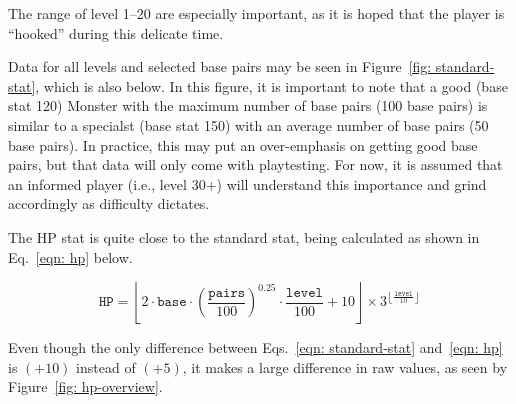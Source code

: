 The range of level 1--20 are especially important, as it is hoped that the player is ``hooked'' during this delicate time.

Data for all levels and selected base pairs may be seen in Figure~\ref{fig: standard-stat}, which is also below. In this figure, it is important to note that a good (base stat 120) Monster with the maximum number of base pairs (100 base pairs) is similar to a specialst (base stat 150) with an average number of base pairs (50 base pairs). In practice, this may put an over-emphasis on getting good base pairs, but that data will only come with playtesting. For now, it is assumed that an informed player (i.e., level 30+) will understand this importance and grind accordingly as difficulty dictates.

			

		




\newpage
{}

The HP stat is quite close to the standard stat, being calculated as shown in Eq.~\eqref{eqn: hp} below.

\begin{equation}\label{eqn: hp}
	\texttt{HP} = \left\lfloor 2\cdot\texttt{base}\cdot\left(\frac{\texttt{pairs}}{100}\right)^{0.25}\cdot\frac{\texttt{level}}{100} + 10 \right\rfloor \times 3^{\left\lfloor\frac{\texttt{level}}{10}\right\rfloor}
\end{equation}

\noindent Even though the only difference between Eqs.~\eqref{eqn: standard-stat} and~\eqref{eqn: hp} is $(+10)$ instead of $(+5)$, it makes a large difference in raw values, as seen by Figure~\ref{fig: hp-overview}.







